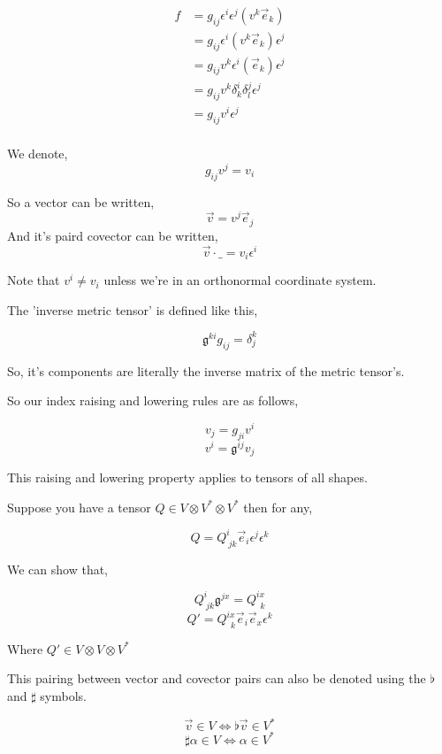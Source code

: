 \documentclass[12pt]{book}
\theoremstyle{plain}
\theoremstyle{definition}
\theoremstyle{ppart}
\theoremstyle{case}
\theoremstyle{solution}
\begin{document}
\begin{align*}
  f &= g_{ij} \epsilon^i \epsilon^j (v^k \vec{e}_k) \\
  &= g_{ij} \epsilon^i (v^k \vec{e}_k) \epsilon^j \\
  &= g_{ij} v^k \epsilon^i (\vec{e}_k) \epsilon^j \\
  &= g_{ij} v^k \delta^i_k \delta^j_l \epsilon^j \\
  &= g_{ij} v^i \epsilon^j \\
\end{align*}

We denote,
\[ g_{ij}v^j = v_i \]

So a vector can be written,
\[ \vec{v} = v^j \vec{e}_j \]
And it's paird covector can be written,
\[ \vec{v} \cdot \_ = v_i \epsilon^i \]

Note that $v^i \ne v_i$ unless we're in an orthonormal coordinate system.

The 'inverse metric tensor' is defined like this,

\[ \mathfrak{g}^{ki} g_{ij} = \delta^k_j \]

So, it's components are literally the inverse matrix of the metric tensor's.

So our index raising and lowering rules are as follows,

\[ v_j = g_{ji} v^i \]
\[ v^i = \mathfrak{g}^{ij} v_j \]

This raising and lowering property applies to tensors of all shapes.

Suppose you have a tensor $Q \in V \otimes V^* \otimes V^*$ then for any,

\[ Q = Q^i_{~jk} \vec{e}_i \epsilon^j \epsilon^k \]

We can show that,

\[ Q^i_{~jk} \mathfrak{g}^{jx} = Q^{ix}_{~~k} \]
\[ Q' = Q^{ix}_{~~k} \vec{e}_i \vec{e}_x \epsilon^k \]

Where $Q' \in V \otimes V \otimes V^*$

This pairing between vector and covector pairs can also be denoted using the $\flat$ and $\sharp$ symbols.

\[ \vec{v} \in V \iff \flat \vec{v} \in V^* \]
\[ \sharp \alpha \in V \iff \alpha \in V^* \]
\end{document}
